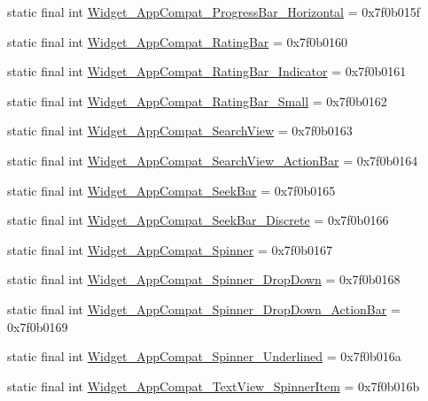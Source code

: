 \begin{CompactItemize}
\item 
static final int \hyperlink{classandroid_1_1support_1_1v4_1_1_r_1_1style_c42240c953536b0a3ab251cd6e2dbf7e}{Widget\_\-AppCompat\_\-ProgressBar\_\-Horizontal} = 0x7f0b015f
\item 
static final int \hyperlink{classandroid_1_1support_1_1v4_1_1_r_1_1style_f9b46bc4de3fdcb40940dd0a8a4087f9}{Widget\_\-AppCompat\_\-RatingBar} = 0x7f0b0160
\item 
static final int \hyperlink{classandroid_1_1support_1_1v4_1_1_r_1_1style_053bd963ce930cd4c05ab4d1a62a960e}{Widget\_\-AppCompat\_\-RatingBar\_\-Indicator} = 0x7f0b0161
\item 
static final int \hyperlink{classandroid_1_1support_1_1v4_1_1_r_1_1style_2877f790ed8c4064a420582546deb5a7}{Widget\_\-AppCompat\_\-RatingBar\_\-Small} = 0x7f0b0162
\item 
static final int \hyperlink{classandroid_1_1support_1_1v4_1_1_r_1_1style_54ca7a3864402195dc419ea807974ba6}{Widget\_\-AppCompat\_\-SearchView} = 0x7f0b0163
\item 
static final int \hyperlink{classandroid_1_1support_1_1v4_1_1_r_1_1style_faeaf691ef275d1b6c846c4eca19192c}{Widget\_\-AppCompat\_\-SearchView\_\-ActionBar} = 0x7f0b0164
\item 
static final int \hyperlink{classandroid_1_1support_1_1v4_1_1_r_1_1style_5d55d65dce707ede7177867606f7a30e}{Widget\_\-AppCompat\_\-SeekBar} = 0x7f0b0165
\item 
static final int \hyperlink{classandroid_1_1support_1_1v4_1_1_r_1_1style_b4f95de8a4c56634f72601820f1b0850}{Widget\_\-AppCompat\_\-SeekBar\_\-Discrete} = 0x7f0b0166
\item 
static final int \hyperlink{classandroid_1_1support_1_1v4_1_1_r_1_1style_8686d813ccaa5662430d1b4ab004b8ea}{Widget\_\-AppCompat\_\-Spinner} = 0x7f0b0167
\item 
static final int \hyperlink{classandroid_1_1support_1_1v4_1_1_r_1_1style_9036b62b0b7f0bf2e97f920b92ed014d}{Widget\_\-AppCompat\_\-Spinner\_\-DropDown} = 0x7f0b0168
\item 
static final int \hyperlink{classandroid_1_1support_1_1v4_1_1_r_1_1style_04ef1bfafeccc3d24b414f70b308c823}{Widget\_\-AppCompat\_\-Spinner\_\-DropDown\_\-ActionBar} = 0x7f0b0169
\item 
static final int \hyperlink{classandroid_1_1support_1_1v4_1_1_r_1_1style_9b7bd76099eea09eeb35eee792248a04}{Widget\_\-AppCompat\_\-Spinner\_\-Underlined} = 0x7f0b016a
\item 
static final int \hyperlink{classandroid_1_1support_1_1v4_1_1_r_1_1style_49dbd1f3212315de04cf796e86e55566}{Widget\_\-AppCompat\_\-TextView\_\-SpinnerItem} = 0x7f0b016b

\end{CompactItemize}
